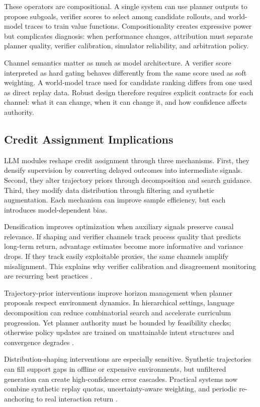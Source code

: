 \documentclass[pdflatex,sn-mathphys-num]{sn-jnl}
\begin{document}
These operators are compositional. A single system can use planner outputs to propose subgoals, verifier scores to select among candidate rollouts, and world-model traces to train value functions. Compositionality creates expressive power but complicates diagnosis: when performance changes, attribution must separate planner quality, verifier calibration, simulator reliability, and arbitration policy.

Channel semantics matter as much as model architecture. A verifier score interpreted as hard gating behaves differently from the same score used as soft weighting. A world-model trace used for candidate ranking differs from one used as direct replay data. Robust design therefore requires explicit contracts for each channel: what it can change, when it can change it, and how confidence affects authority.

\subsection{Credit Assignment Implications}
LLM modules reshape credit assignment through three mechanisms. First, they densify supervision by converting delayed outcomes into intermediate signals. Second, they alter trajectory priors through decomposition and search guidance. Third, they modify data distribution through filtering and synthetic augmentation. Each mechanism can improve sample efficiency, but each introduces model-dependent bias.

Densification improves optimization when auxiliary signals preserve causal relevance. If shaping and verifier channels track process quality that predicts long-term return, advantage estimates become more informative and variance drops. If they track easily exploitable proxies, the same channels amplify misalignment. This explains why verifier calibration and disagreement monitoring are recurring best practices \cite{arxiv_p_2602_06493,arxiv_p_2602_12579,arxiv_p_2508_03680,arxiv_p_2602_02395}.

Trajectory-prior interventions improve horizon management when planner proposals respect environment dynamics. In hierarchical settings, language decomposition can reduce combinatorial search and accelerate curriculum progression. Yet planner authority must be bounded by feasibility checks; otherwise policy updates are trained on unattainable intent structures and convergence degrades \cite{arxiv_p_2602_16165,arxiv_p_2510_24699,arxiv_p_2512_20275}.

Distribution-shaping interventions are especially sensitive. Synthetic trajectories can fill support gaps in offline or expensive environments, but unfiltered generation can create high-confidence error cascades. Practical systems now combine synthetic replay quotas, uncertainty-aware weighting, and periodic re-anchoring to real interaction return \cite{arxiv_p_2601_08107,arxiv_p_2602_14468,arxiv_p_2601_22149}.
\end{document}

